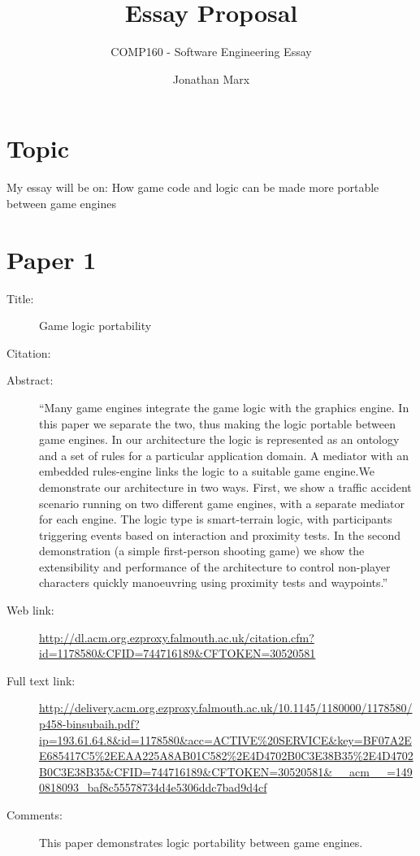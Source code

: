 \documentclass{scrartcl}
\title{Essay Proposal}
\subtitle{COMP160 - Software Engineering Essay}
\author{Jonathan Marx}
\begin{document}
\maketitle

\section*{Topic}

My essay will be on: How game code and logic can be made more portable between game engines


\section*{Paper 1}
\begin{description}
\item[Title:] Game logic portability
\item[Citation:] \cite{GameLogic}
\item[Abstract:] ``Many game engines integrate the game logic with the graphics engine. In this paper we separate the two, thus making the logic portable between game engines. In our architecture the logic is represented as an ontology and a set of rules for a particular application domain. A mediator with an embedded rules-engine links the logic to a suitable game engine.We demonstrate our architecture in two ways. First, we show a traffic accident scenario running on two different game engines, with a separate mediator for each engine. The logic type is smart-terrain logic, with participants triggering events based on interaction and proximity tests. In the second demonstration (a simple first-person shooting game) we show the extensibility and performance of the architecture to control non-player characters quickly manoeuvring using proximity tests and waypoints.''
\item[Web link:] \url{http://dl.acm.org.ezproxy.falmouth.ac.uk/citation.cfm?id=1178580&CFID=744716189&CFTOKEN=30520581}
\item[Full text link:] \url{http://delivery.acm.org.ezproxy.falmouth.ac.uk/10.1145/1180000/1178580/p458-binsubaih.pdf?ip=193.61.64.8&id=1178580&acc=ACTIVE%20SERVICE&key=BF07A2EE685417C5%2EEAA225A8AB01C582%2E4D4702B0C3E38B35%2E4D4702B0C3E38B35&CFID=744716189&CFTOKEN=30520581&__acm__=1490818093_baf8c55578734d4e5306ddc7bad9d4cf}
\item[Comments:] This paper demonstrates logic portability between game engines.
\end{description}
\end{document}
